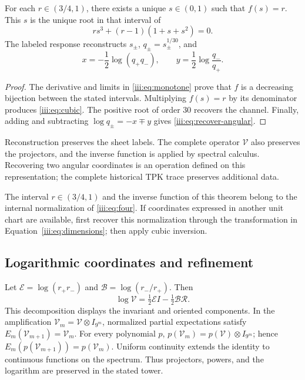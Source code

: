 \begin{theorem}
For each $r\in(3/4,1)$, there exists a unique $s\in(0,1)$ such that $f(s)=r$.
This $s$ is the unique root in that interval of
\begin{equation}
 r s^3+(r-1)(1+s+s^2)=0.
 \label{iii:eq:cubic}
\end{equation}
The labeled response reconstructs $s_\pm$, $q_\pm=s_\pm^{1/30}$, and
\begin{equation}
 x=-\frac12\log(q_+q_-),\qquad
 y=\frac12\log\frac{q_-}{q_+}.
 \label{iii:eq:recover-angular}
\end{equation}
\end{theorem}
\begin{proof}
The derivative and limits in \eqref{iii:eq:monotone} prove that $f$ is a
decreasing bijection between the stated intervals. Multiplying $f(s)=r$
by its denominator produces \eqref{iii:eq:cubic}. The positive root of order
$30$ recovers the channel. Finally, adding and subtracting
$\log q_\pm=-x\mp y$ gives \eqref{iii:eq:recover-angular}.
\end{proof}

Reconstruction preserves the sheet labels. The complete operator
$\mathcal V$ also preserves the projectors, and the inverse function is applied
by spectral calculus. Recovering two angular coordinates is an
operation defined on this representation; the complete historical
TPK trace preserves additional data.

The interval $r\in(3/4,1)$ and the inverse function of this theorem belong
to the internal normalization of \eqref{iii:eq:four}. If coordinates
expressed in another unit chart are available, first recover
this normalization through the transformation in
Equation~\eqref{iii:eq:dimensions}; then apply cubic inversion.

\subsection{Logarithmic coordinates and refinement}

Let $\mathcal E=\log(r_+r_-)$ and $\mathcal B=\log(r_-/r_+)$. Then
\begin{equation}
 \log\mathcal V=\tfrac12\mathcal E I-\tfrac12\mathcal B\mathcal R.
 \label{iii:eq:logvac}
\end{equation}
This decomposition displays the invariant and oriented components.
In the amplification $\mathcal V_m=\mathcal V\otimes I_{9^m}$, normalized
partial expectations satisfy
$E_m(\mathcal V_{m+1})=\mathcal V_m$. For every polynomial $p$,
$p(\mathcal V_m)=p(\mathcal V)\otimes I_{9^m}$; hence
$E_m(p(\mathcal V_{m+1}))=p(\mathcal V_m)$. Uniform continuity
extends the identity to continuous functions on the spectrum.
Thus projectors, powers, and the logarithm are preserved in the stated tower.

